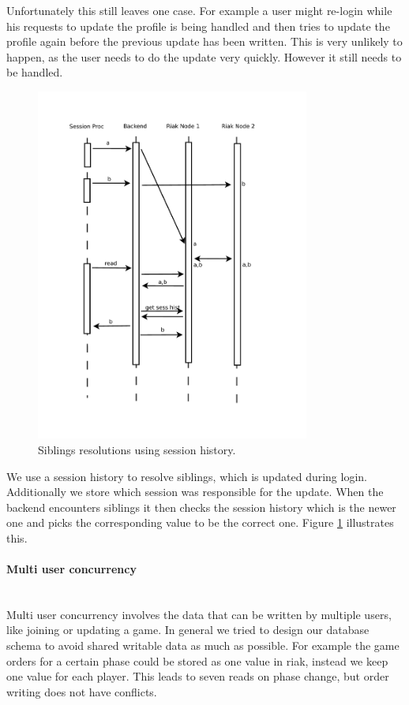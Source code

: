 \documentclass[11pt,a4paper]{report}
\newcommand{\subsubsubsection}[1]{\paragraph{#1}\mbox{}\\}
\begin{document}
Unfortunately this still leaves one case.
For example a user might re-login while his requests to update the profile is
being handled and then tries to update the profile again before the previous
update has been written.
This is very unlikely to happen, as the user needs to do the update very quickly.
However it still needs to be handled.
\begin{figure}[htbp!]
  \centering
 \includegraphics[width=9cm]{./graphics/Concurrency_-_Conflict_resolution_using_session_history.pdf}
 \vspace{-1cm}
 \caption{Siblings resolutions using session history.}
 \label{fig:concurrency:history}
\end{figure}
We use a session history to resolve siblings, which is updated during login.
Additionally we store which session was responsible for the update.
When the backend encounters siblings it then checks the session history which
is the newer one and picks the corresponding value to be the correct one.
Figure \ref{fig:concurrency:history} illustrates this.

\subsubsubsection{Multi user concurrency}
Multi user concurrency involves the data that can be written by multiple users,
like joining or updating a game.
In general we tried to  design our database schema to avoid shared writable data
as much as possible.
For example the game orders for a certain phase could be stored as one value in riak,
instead we keep one value for each player.
This leads to seven reads on phase change, but order writing does not have conflicts.
\end{document}
